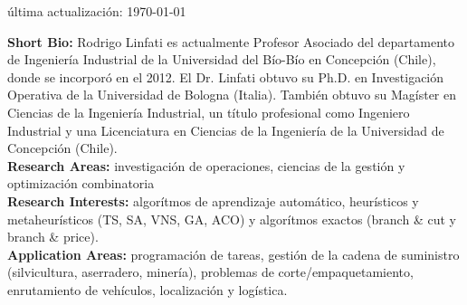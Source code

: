 \makecvtitle
\'ultima actualizaci\'on: \today

\textbf{Short Bio:} Rodrigo Linfati es actualmente Profesor Asociado del departamento de Ingenier\'ia Industrial de la Universidad del B\'io-B\'io en Concepci\'on (Chile), donde se incorpor\'o en el 2012. El Dr. Linfati obtuvo su Ph.D. en Investigaci\'on Operativa de la Universidad de Bologna (Italia). Tambi\'en obtuvo su Mag\'ister en Ciencias de la Ingenier\'ia Industrial, un t\'itulo profesional como Ingeniero Industrial y una Licenciatura en Ciencias de la Ingenier\'ia de la Universidad de Concepci\'on (Chile).
~ \\
\textbf{Research Areas:} investigaci\'on de operaciones, ciencias de la gesti\'on y optimizaci\'on combinatoria
~ \\
\textbf{Research Interests:} algor\'itmos de aprendizaje autom\'atico, heur\'isticos y metaheur\'isticos (TS, SA, VNS, GA, ACO) y algor\'itmos exactos (branch \& cut y branch \& price).
~ \\
\textbf{Application Areas:} programaci\'on de tareas, gesti\'on de la cadena de suministro (silvicultura, aserradero, miner\'ia), problemas de corte/empaquetamiento, enrutamiento de veh\'iculos, localizaci\'on y log\'istica.

\clearpage